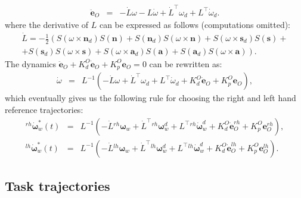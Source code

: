 \documentclass[12pt,a4paper,twoside]{article}
\begin{document}
\begin{eqnarray*} 
\ddot {\bm e}_O & = & -\dot L \omega - L \dot \omega + \dot L^\top \omega_d + L^\top \dot \omega_d.
\end{eqnarray*}
where the derivative of $L$ can be expressed as follows (computations omitted):
\begin{multline*} 
\dot L = - \frac{1}{2} \left( S(\omega \times \mathbf n_d) S(\mathbf n) + S({\mathbf n_d}) S(\omega \times \mathbf n) + S(\omega \times \mathbf s_d) S(\mathbf s) + \right. \\ + \left. S({\mathbf s}_d) S(\omega \times \mathbf s) + S(\omega \times \mathbf a_d) S(\mathbf a) + S({\mathbf a}_d) S(\omega \times \mathbf a)\right).
\end{multline*}
The dynamics $\ddot {\bm e}_O + K_d^O \dot {\bm e}_O + K_p^O {\bm e}_O = 0$ can be rewritten as:
\begin{eqnarray*} 
\dot \omega & = & L^{-1} \left( -\dot L \omega  + \dot L^\top \omega_d + L^\top \dot \omega_d + K_d^O \dot {\bm e}_O + K_p^O {\bm e}_O \right),
\end{eqnarray*}
which eventually gives us the following rule for choosing the right and left hand reference trajectories:
\begin{eqnarray*} 
{}^{rh}{\dot {\bm \omega}}_w^* (t) & = & L^{-1} \left( -\dot L {}^{rh}{{\bm \omega}}_w  + \dot L^\top {}^{rh}{{\bm \omega}}_w^d + L^\top {}^{rh}{\dot {\bm \omega}}_w^d + K_d^O \dot {\bm e}_O^{rh} + K_p^O {\bm e}_O^{rh} \right), \\
{}^{lh}{\dot {\bm \omega}}_w^* (t) & = & L^{-1} \left( -\dot L {}^{lh}{{\bm \omega}}_w  + \dot L^\top {}^{lh}{{\bm \omega}}_w^d + L^\top {}^{lh}{\dot {\bm \omega}}_w^d + K_d^O \dot {\bm e}_O^{lh} + K_p^O {\bm e}_O^{lh} \right).
\end{eqnarray*}


\subsection{Task trajectories} \label{sec:refTrajectories}
\end{document}
